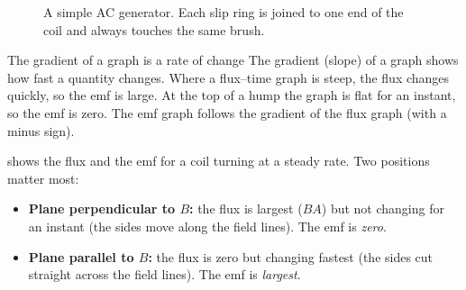 \begin{figure}
  \caption{A simple AC generator. Each slip ring is joined to one end of the coil and
    always touches the same brush.}\label{ch5:fig:acgen}
\end{figure}

\begin{toolkit}{The gradient of a graph is a rate of change}
The gradient (slope) of a graph shows how fast a quantity changes. Where a flux--time
graph is steep, the flux changes quickly, so the emf is large. At the top of a hump the
graph is flat for an instant, so the emf is zero. The emf graph follows the gradient of
the flux graph (with a minus sign).
\end{toolkit}

 shows the flux and the emf for a coil turning at a steady
rate. Two positions matter most:
\begin{itemize}
  \item \textbf{Plane perpendicular to $B$:} the flux is largest ($BA$) but not changing
        for an instant (the sides move along the field lines). The emf is \emph{zero}.
  \item \textbf{Plane parallel to $B$:} the flux is zero but changing fastest (the sides
        cut straight across the field lines). The emf is \emph{largest}.
\end{itemize}

